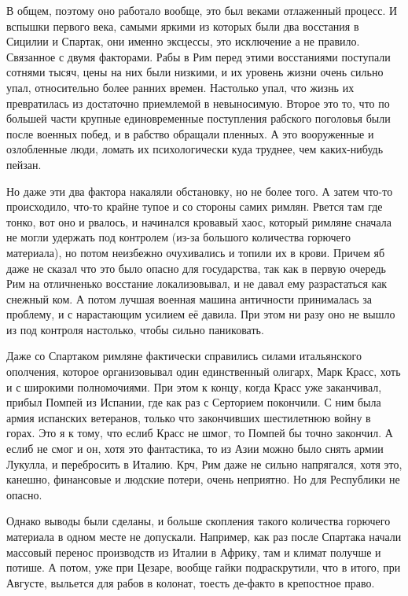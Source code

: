В общем, поэтому оно работало вообще, это был веками отлаженный процесс. И вспышки первого века, самыми яркими из которых были два восстания в Сицилии и Спартак, они именно эксцессы, это исключение а не правило. Связанное с двумя факторами. Рабы в Рим перед этими восстаниями поступали сотнями тысяч, цены на них были низкими, и их уровень жизни очень сильно упал, относительно более ранних времен. Настолько упал, что жизнь их превратилась из достаточно приемлемой в невыносимую. Второе это то, что по большей части крупные единовременные поступления рабского поголовья были после военных побед, и в рабство обращали пленных. А это вооруженные и озлобленные люди, ломать их психологически куда труднее, чем каких-нибудь пейзан.


Но даже эти два фактора накаляли обстановку, но не более того. А затем что-то происходило, что-то крайне тупое и со стороны самих римлян. Рвется там где тонко, вот оно и рвалось, и начинался кровавый хаос, который римляне сначала не могли удержать под контролем (из-за большого количества горючего материала), но потом неизбежно очухивались и топили их в крови. Причем яб даже не сказал что это было опасно для государства, так как в первую очередь Рим на отличненько восстание локализовывал, и не давал ему разрастаться как снежный ком. А потом лучшая военная машина античности принималась за проблему, и с нарастающим усилием её давила. При этом ни разу оно не вышло из под контроля настолько, чтобы сильно паниковать.

Даже со Спартаком римляне фактически справились силами итальянского ополчения, которое организовывал один единственный олигарх, Марк Красс, хоть и с широкими полномочиями. При этом к концу, когда Красс уже заканчивал, прибыл Помпей из Испании, где как раз с Серторием покончили. С ним была армия испанских ветеранов, только что закончивших шестилетнюю войну в горах. Это я к тому, что еслиб Красс не шмог, то Помпей бы точно закончил. А еслиб не смог и он, хотя это фантастика, то из Азии можно было снять армии Лукулла, и перебросить в Италию. Крч, Рим даже не сильно напрягался, хотя это, канешно, финансовые и людские потери, очень неприятно. Но для Республики не опасно.


Однако выводы были сделаны, и больше скопления такого количества горючего материала в одном месте не допускали. Например, как раз после Спартака начали массовый перенос производств из Италии в Африку, там и климат получше и потише. А потом, уже при Цезаре, вообще гайки подраскрутили, что в итого, при Августе, выльется для рабов в колонат, тоесть де-факто в крепостное право.

